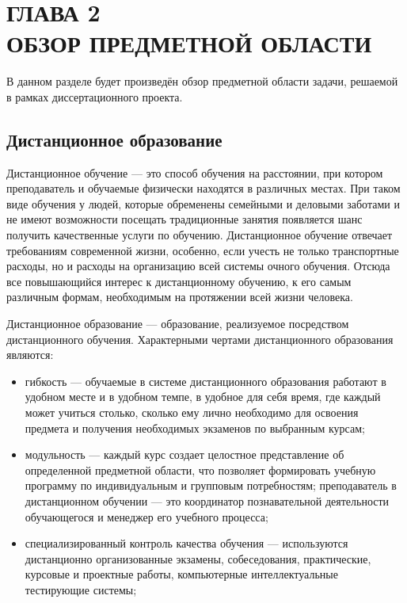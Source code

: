 \section*{ГЛАВА 2\\ ОБЗОР ПРЕДМЕТНОЙ ОБЛАСТИ}
\setcounter{section}{2}\setcounter{subsection}{0}

В данном разделе будет произведён обзор предметной области задачи,
решаемой в рамках диссертационного проекта.

\subsection{Дистанционное образование}

Дистанционное обучение — это способ обучения на расстоянии, при котором преподаватель и
обучаемые физически находятся в различных местах. При таком виде обучения у людей, которые
обременены семейными и деловыми заботами и не имеют возможности посещать традиционные занятия
появляется шанс получить качественные услуги по обучению. Дистанционное обучение отвечает
требованиям современной жизни, особенно, если учесть не только транспортные расходы, но и
расходы на организацию всей системы очного обучения. Отсюда все повышающийся интерес к
дистанционному обучению, к его самым различным формам, необходимым на протяжении
всей жизни человека.\cite{moluch}

Дистанционное образование — образование, реализуемое посредством дистанционного обучения.
Характерными чертами дистанционного образования являются:
\begin{itemize}[wide,topsep=0pt]
  \itemsep0em
  \item гибкость — обучаемые в системе дистанционного образования работают в удобном месте и в удобном темпе,
  в удобное для себя время, где каждый может учиться столько, сколько ему лично необходимо для
  освоения предмета и получения необходимых экзаменов по выбранным курсам;
  \item модульность — каждый курс создает целостное представление об определенной предметной области,
  что позволяет формировать учебную программу по индивидуальным и групповым потребностям; преподаватель в дистанционном обучении — это координатор познавательной деятельности
  обучающегося и менеджер его учебного процесса;
  \item специализированный контроль качества обучения —
  используются дистанционно организованные экзамены, собеседования, практические, курсовые и
  проектные работы, компьютерные интеллектуальные тестирующие системы;
\end{itemize}

